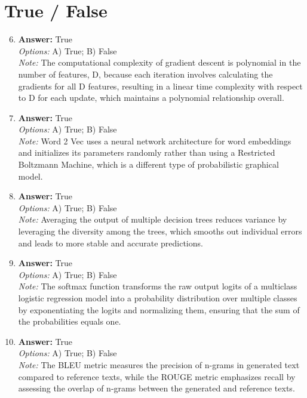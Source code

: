 \documentclass[12pt]{article}
\begin{document}
\section*{True / False}
\begin{enumerate}[label=\arabic*.]
\setcounter{enumi}{5}
\item \textbf{Answer:} True
\\ \textit{Options:} A) True; B) False
\\ \textit{Note:} The computational complexity of gradient descent is polynomial in the number of features, D, because each iteration involves calculating the gradients for all D features, resulting in a linear time complexity with respect to D for each update, which maintains a polynomial relationship overall.
\item \textbf{Answer:} True
\\ \textit{Options:} A) True; B) False
\\ \textit{Note:} Word 2 Vec uses a neural network architecture for word embeddings and initializes its parameters randomly rather than using a Restricted Boltzmann Machine, which is a different type of probabilistic graphical model.
\item \textbf{Answer:} True
\\ \textit{Options:} A) True; B) False
\\ \textit{Note:} Averaging the output of multiple decision trees reduces variance by leveraging the diversity among the trees, which smooths out individual errors and leads to more stable and accurate predictions.
\item \textbf{Answer:} True
\\ \textit{Options:} A) True; B) False
\\ \textit{Note:} The softmax function transforms the raw output logits of a multiclass logistic regression model into a probability distribution over multiple classes by exponentiating the logits and normalizing them, ensuring that the sum of the probabilities equals one.
\item \textbf{Answer:} True
\\ \textit{Options:} A) True; B) False
\\ \textit{Note:} The BLEU metric measures the precision of n-grams in generated text compared to reference texts, while the ROUGE metric emphasizes recall by assessing the overlap of n-grams between the generated and reference texts.
\end{enumerate}
\end{document}
